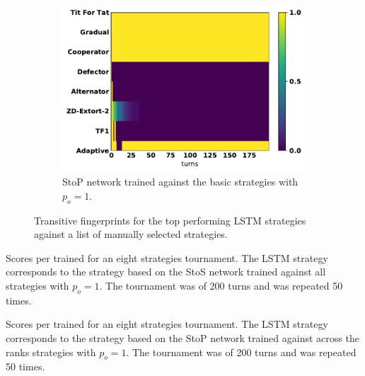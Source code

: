 \begin{figure}[!htbp]
\begin{subfigure}{.32\textwidth}
        \includegraphics[width=\textwidth]{src/chapters/07/img/s_t_p_basic_against_seven_opponents.pdf}
        \caption{StoP network trained
        against the basic strategies with $p_o=1$.}
    \end{subfigure}
    \caption{Transitive fingerprints for the top performing LSTM strategies against
    a list of manually selected strategies.}\label{fig:transitive_fingerprints_against_seven}
\end{figure}

\begin{table}[!htbp]
    \begin{center}
    \resizebox{\textwidth}{!}{
        
    }
\end{center}
\caption{Scores per trained for an eight strategies tournament. The LSTM strategy
corresponds to the strategy based on the StoS network trained
against all strategies with $p_o=1$. The tournament was of 200 turns and was
repeated 50 times.}\label{table:scores_s_to_s_against_seven}
\end{table}

\begin{table}[!htbp]
    \begin{center}
    \resizebox{\textwidth}{!}{
        
    }
\end{center}
\caption{Scores per trained for an eight strategies tournament. The LSTM
strategy corresponds to the strategy based on the StoP network trained against
across the ranks strategies with $p_o=1$. The tournament was of 200 turns and
was repeated 50 times.}\label{table:scores_s_to_p_twenty_against_seven}
\end{table}

